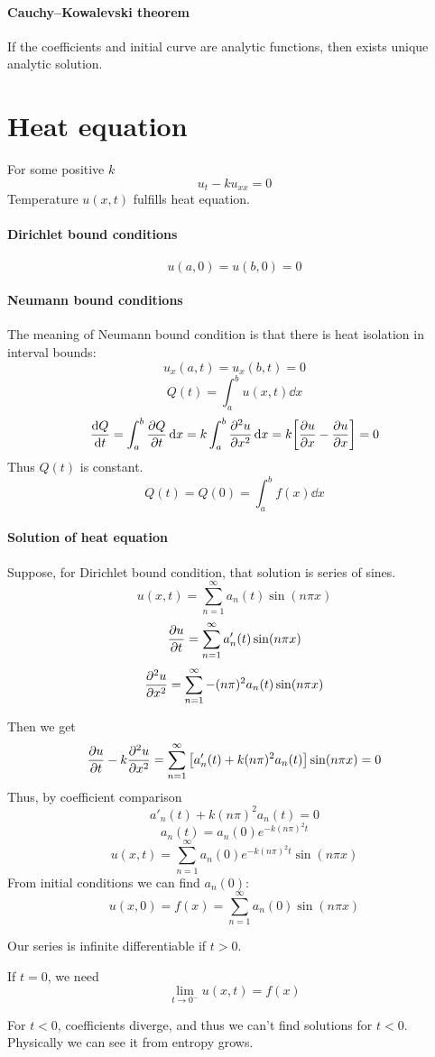 \paragraph{Cauchy–Kowalevski theorem}
If the coefficients and initial curve are analytic functions, then exists unique analytic solution. 

\section{Heat equation}
For some positive $k$
$$u_t - ku_{xx}  = 0$$
Temperature $u(x,t)$ fulfills heat equation.
\paragraph{Dirichlet bound conditions}
$$u(a,0) =  u(b,0) = 0$$
\paragraph{Neumann bound conditions}
The meaning of Neumann bound condition is that there is heat isolation in interval bounds:
$$u_x(a,t) = u_x(b,t) = 0$$
$$Q(t) = \int_a^b u(x,t) \dd{x} $$
$$\dv{Q}{t} = \int_a^b \pdv{Q}{t}(x,t) \dd{x} = k \int_a^b \pdv[2]{u}{x} (x,t) \dd{x} = k \qty[\pdv{u}{x} (,t) - \pdv{u}{x} (a,t)] = 0$$
Thus $Q(t)$ is constant. $$Q(t)=Q(0) = \int_a^b f(x) \dd{x}$$
\paragraph{Solution of heat equation}
Suppose, for Dirichlet bound condition, that solution is series of sines.
$$u(x,t) = \sum_{n=1}^\infty a_n(t) \sin(n\pi x)$$
$$\pdv{u}{t} = \sum_{n=1}^\infty a'_n(t) \sin(n\pi x)$$
$$\pdv[2]{u}{x} = \sum_{n=1}^\infty -(n\pi)^2 a_n(t) \sin(n \pi x)$$

Then we get
$$\pdv{u}{t} - k \pdv[2]{u}{x} = \sum_{n=1}^\infty \qty[a'_n(t) + k(n\pi)^2 a_n(t) ]\sin(n\pi x) = 0$$
Thus, by coefficient comparison
$$a'_n(t) + k(n\pi)^2 a_n(t)  = 0$$
$$a_n(t) = a_n(0) e^{-k(n\pi)^2t}$$
$$u(x,t) = \sum_{n=1}^\infty a_n(0) e^{-k(n\pi)^2t}\sin(n\pi x)$$
From initial conditions we can find $a_n(0)$:
$$u(x,0) = f(x) = \sum_{n=1}^\infty a_n(0)\sin(n\pi x)$$

Our series is infinite differentiable if $t>0$.

If $t=0$, we need 
$$\lim_{t \to 0^-} u(x,t) = f(x)$$

For $t<0$, coefficients diverge, and thus we can't find solutions for $t<0$. Physically we can see it from entropy grows.

